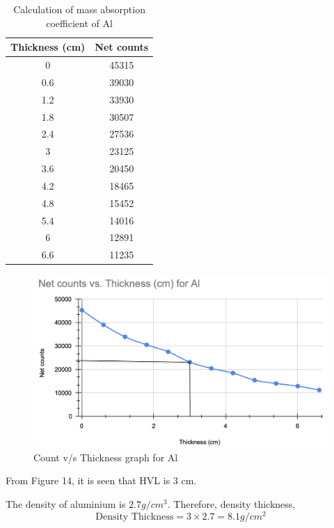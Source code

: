 \documentclass[a4paper, amsfonts, amssymb, amsmath, reprint, showkeys, nofootinbib, twoside]{revtex4-1}
\begin{document}
\begin{table}[H]
	\centering
	\caption{Calculation of mass absorption coefficient of Al}
	\label{t3}
	\begin{tabular}{|c|c|}
		\hline
		Thickness (cm) & Net counts \\ \hline
		0              & 45315      \\ \hline
		0.6            & 39030      \\ \hline
		1.2            & 33930      \\ \hline
		1.8            & 30507      \\ \hline
		2.4            & 27536      \\ \hline
		3              & 23125      \\ \hline
		3.6            & 20450      \\ \hline
		4.2            & 18465      \\ \hline
		4.8            & 15452      \\ \hline
		5.4            & 14016      \\ \hline
		6              & 12891      \\ \hline
		6.6            & 11235      \\ \hline
	\end{tabular}
\end{table}

\begin{figure}[H]
	\centering
	\includegraphics[width=\columnwidth]{mc}
	\caption{Count v/s Thickness graph for Al}
\end{figure}

From Figure 14, it is seen that HVL is 3 cm.

The density of aluminium is $2.7 g/cm^3$. Therefore, density thickness,
\begin{equation}
	\text{Density Thickness}=3\times2.7=8.1 g/cm^2
\end{equation}
\end{document}
